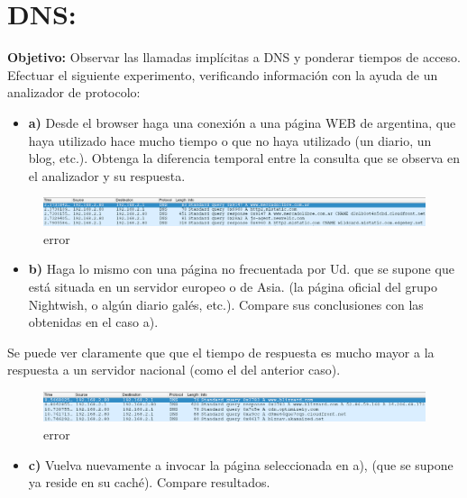 \documentclass[12pt]{extarticle}
\makeatletter
\def\maxwidth{\ifdim\Gin@nat@width>\linewidth\linewidth
    \else\Gin@nat@width\fi}
\let\Oldincludegraphics\includegraphics
\renewcommand{\includegraphics}[1]{\Oldincludegraphics[width=.8\maxwidth]{#1}}
\providecommand{\tightlist}{%
      \setlength{\itemsep}{0pt}\setlength{\parskip}{0pt}}
\makeatother
\begin{document}
    \section{DNS:}\label{dns}

\textbf{Objetivo:} Observar las llamadas implícitas a DNS y ponderar
tiempos de acceso. Efectuar el siguiente experimento, verificando
información con la ayuda de un analizador de protocolo:

\begin{itemize}
\tightlist
\item
  \textbf{a)} Desde el browser haga una conexión a una página WEB de
  argentina, que haya utilizado hace mucho tiempo o que no haya
  utilizado (un diario, un blog, etc.). Obtenga la diferencia temporal
  entre la consulta que se observa en el analizador y su respuesta.
\end{itemize}

\begin{figure}
\centering
\includegraphics{images/server_nacional.png}
\caption{error}
\end{figure}

\begin{itemize}
\tightlist
\item
  \textbf{b)} Haga lo mismo con una página no frecuentada por Ud. que se
  supone que está situada en un servidor europeo o de Asia. (la página
  oficial del grupo Nightwish, o algún diario galés, etc.). Compare sus
  conclusiones con las obtenidas en el caso a).
\end{itemize}

Se puede ver claramente que que el tiempo de respuesta es mucho mayor a
la respuesta a un servidor nacional (como el del anterior caso).

\begin{figure}
\centering
\includegraphics{images/server_externo.png}
\caption{error}
\end{figure}

\begin{itemize}
\tightlist
\item
  \textbf{c)} Vuelva nuevamente a invocar la página seleccionada en a),
  (que se supone ya reside en su caché). Compare resultados.
\end{itemize}
\end{document}
